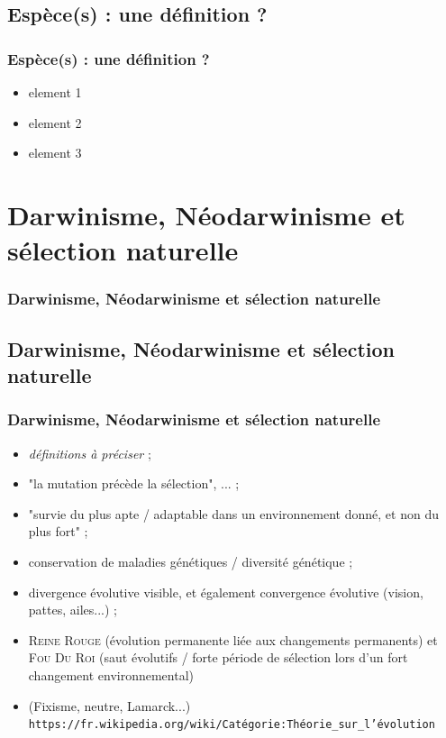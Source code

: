 \documentclass{beamer}
\begin{document}
\subsection{ Esp{\`e}ce(s) : une d{\'e}finition ? }
\begin{frame}
	\frametitle{ Esp{\`e}ce(s) : une d{\'e}finition ? }
	\begin{itemize}
		\item element 1
		\item element 2
		\item element 3
	\end{itemize}
\end{frame}


\section{Darwinisme, N{\'e}odarwinisme et s{\'e}lection naturelle }
\begin{frame}
	\frametitle{Darwinisme, N{\'e}odarwinisme et s{\'e}lection naturelle }
	\tableofcontents[sections=5,currentsection,subsectionstyle=show/shaded/hide]
\end{frame} 

\subsection{ Darwinisme, N{\'e}odarwinisme et s{\'e}lection naturelle }
\begin{frame}
	\frametitle{ Darwinisme, N{\'e}odarwinisme et s{\'e}lection naturelle }
	\begin{itemize}
		\item \emph{d{\'e}finitions {\`a} pr{\'e}ciser} ; 
		\item "la mutation pr{\'e}c{\`e}de la s{\'e}lection", ... ; 
		\item "survie du plus apte / adaptable dans un environnement donn{\'e}, et non du plus fort" ; 
		\item conservation de maladies g{\'e}n{\'e}tiques / diversit{\'e} g{\'e}n{\'e}tique ; 
		\item divergence {\'e}volutive visible, et {\'e}galement convergence {\'e}volutive (vision, pattes, ailes...) ; 
		\item \textsc{Reine Rouge} ({\'e}volution permanente li{\'e}e aux changements permanents) et \textsc{Fou Du Roi} (saut {\'e}volutifs / forte p{\'e}riode de s{\'e}lection lors d'un fort changement environnemental)
		\item (Fixisme, neutre, Lamarck...) \texttt{https://fr.wikipedia.org/wiki/Cat{\'e}gorie:Th{\'e}orie\_sur\_l'{\'e}volution} 
	\end{itemize}
\end{frame}
\end{document}
